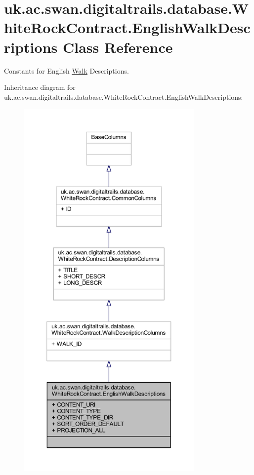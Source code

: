 \hypertarget{classuk_1_1ac_1_1swan_1_1digitaltrails_1_1database_1_1_white_rock_contract_1_1_english_walk_descriptions}{\section{uk.\+ac.\+swan.\+digitaltrails.\+database.\+White\+Rock\+Contract.\+English\+Walk\+Descriptions Class Reference}
\label{classuk_1_1ac_1_1swan_1_1digitaltrails_1_1database_1_1_white_rock_contract_1_1_english_walk_descriptions}
}


Constants for English \hyperlink{classuk_1_1ac_1_1swan_1_1digitaltrails_1_1database_1_1_white_rock_contract_1_1_walk}{Walk} Descriptions.  




Inheritance diagram for uk.\+ac.\+swan.\+digitaltrails.\+database.\+White\+Rock\+Contract.\+English\+Walk\+Descriptions\+:
\nopagebreak
\begin{figure}[H]
\begin{center}
\leavevmode
\includegraphics[height=550pt]{classuk_1_1ac_1_1swan_1_1digitaltrails_1_1database_1_1_white_rock_contract_1_1_english_walk_descriptions__inherit__graph}
\end{center}
\end{figure}


